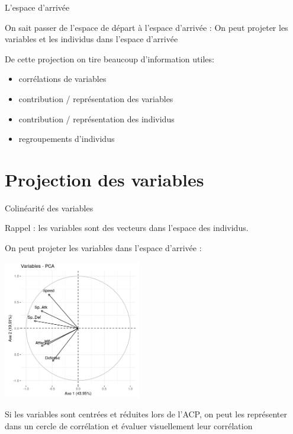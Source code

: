 \documentclass{beamer}
\begin{document}
\begin{frame}{L'espace d'arrivée}

On sait passer de l'espace de départ à l'espace d'arrivée : 
On peut \alert{projeter} les variables et les individus dans l'espace d'arrivée

\medskip

De cette projection on tire beaucoup d'information utiles: 


\begin{itemize}
\item corrélations de variables
\item contribution / représentation  des variables 
\item contribution / représentation des individus 
\item regroupements d'individus
\end{itemize}
\end{frame}



\section{Projection des variables}



\begin{frame}{Colinéarité des variables}

Rappel : les variables sont des vecteurs dans l'espace des individus. 

On peut projeter les variables dans l'espace d'arrivée : 

\begin{center}
\includegraphics[width=0.45\textwidth,keepaspectratio]{img/cercle_trigo_ACP_var.png}
\end{center}
\begin{spacing}{0.7}
\begin{small}
Si les variables sont centrées et réduites lors de l'ACP, on peut les représenter dans un cercle de corrélation et évaluer visuellement leur  corrélation
\end{small}
\end{spacing}

\end{frame}
\end{document}
